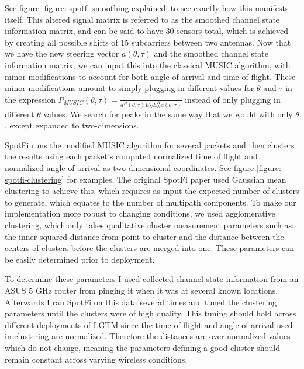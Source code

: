 \documentclass[12pt]{report}
\begin{document}
See figure \ref{figure: spotfi-smoothing-explained} to see exactly how this manifests itself. This altered signal matrix is referred to as the smoothed channel state information matrix, and can be said to have $30$ sensors total, which is achieved by creating all possible shifts of $15$ subcarriers between two antennas. Now that we have the new steering vector $a(\theta, \tau)$ and the smoothed channel state information matrix, we can input this into the classical MUSIC algorithm, with minor modifications to account for both angle of arrival and time of flight. These minor modifications amount to simply plugging in different values for $\theta$ and $\tau$ in the expression $P_{MUSIC}(\theta, \tau) = \frac{1}{a^{H}(\theta, \tau) E_{N} E^{H}_{N} a(\theta, \tau)}$ instead of only plugging in different $\theta$ values. We search for peaks in the same way that we would with only $\theta$, except expanded to two-dimensions. \par

SpotFi runs the modified MUSIC algorithm for several packets and then clusters the results using each packet's computed normalized time of flight and normalized angle of arrival as two-dimensional coordinates. See figure \ref{figure: spotfi-clustering} for examples. The original SpotFi paper used Gaussian mean clustering to achieve this, which requires as input the expected number of clusters to generate, which equates to the number of multipath components. To make our implementation more robust to changing conditions, we used agglomerative clustering, which only takes qualitative cluster measurement parameters such as: the inner squared distance from point to cluster and the distance between the centers of clusters before the clusters are merged into one. These parameters can be easily determined prior to deployment. \par

To determine these parameters I used collected channel state information from an ASUS 5 GHz router from pinging it when it was at several known locations. Afterwards I ran SpotFi on this data several times and tuned the clustering parameters until the clusters were of high quality. This tuning should hold across different deployments of LGTM since the time of flight and angle of arrival used in clustering are normalized. Therefore the distances are over normalized values which do not change, meaning the parameters defining a good cluster should remain constant across varying wireless conditions. \par
\end{document}
